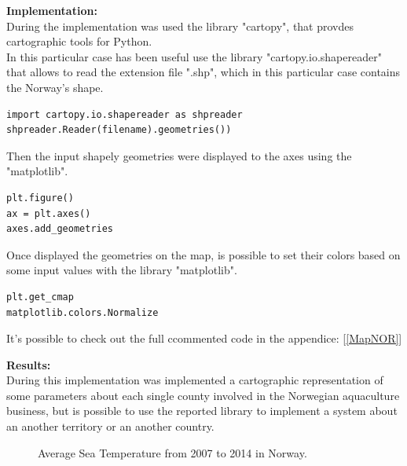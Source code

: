 \textbf{Implementation:}\\
During the implementation was used the library "cartopy", that provdes cartographic tools for Python. \\
In this particular case has been useful use the library "cartopy.io.shapereader" that allows to read the extension file ".shp", which in this particular case contains the Norway's shape.
\begin{lstlisting}
import cartopy.io.shapereader as shpreader
shpreader.Reader(filename).geometries())
\end{lstlisting}

Then the input shapely geometries were displayed  to the axes using the "matplotlib".
\begin{lstlisting}
plt.figure()
ax = plt.axes()
axes.add_geometries
\end{lstlisting}

Once displayed the geometries on the map, is possible to set their colors based on some input values with the library "matplotlib".
\begin{lstlisting}
plt.get_cmap
matplotlib.colors.Normalize
\end{lstlisting}

It's possible to check out the full ccommented code in the appendice: [\ref{MapNOR}]

\textbf{Results:} \\
During this implementation was implemented a cartographic representation of some parameters about each single county involved in the Norwegian aquaculture business, but is possible to use the reported library to implement a system about an another territory or an another country.
\begin{figure}[H]
    \caption{Average Sea Temperature from 2007 to 2014 in Norway.}
\end{figure}
